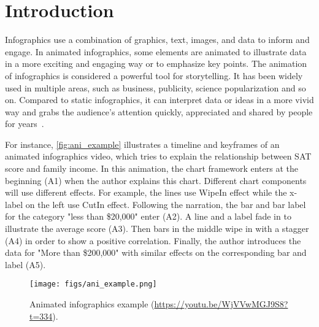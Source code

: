 \section{Introduction}
\label{sec:intro}

Infographics use a combination of graphics, text, images, and data to inform and engage.
In animated infographics, some elements are animated to illustrate data in a more exciting and engaging way or to emphasize key points.
The animation of infographics is considered a powerful tool for storytelling. 
It has been widely used in multiple areas, such as business, publicity, science popularization and so on. 
Compared to static infographics, it can interpret data or ideas in a more vivid way and grabs the audience's attention quickly, appreciated and shared by people for years~\cite{blazer2019animated, brehmer2016timelines}. %

For instance, \autoref{fig:ani_example} illustrates a timeline and keyframes of an animated infographics video, which tries to explain the relationship between SAT score and family income.
In this animation, the chart framework enters at the beginning (A1) when the author explains this chart.
Different chart components will use different effects. For example, the lines use WipeIn effect while the x-label on the left use CutIn effect.
Following the narration, the bar and bar label for the category "less than \$20,000" enter (A2). A line and a label fade in to illustrate the average score (A3).
Then bars in the middle wipe in with a stagger (A4) in order to show a positive correlation.
Finally, the author introduces the data for "More than \$200,000" with similar effects on the corresponding bar and label (A5).

\begin{figure}[h]
  \centering
  \texttt{[image: figs/ani\_example.png]}
  \caption{Animated infographics example (\url{https://youtu.be/WjVVwMGJ9S8?t=334}).}
  \label{fig:ani_example}
\end{figure}

